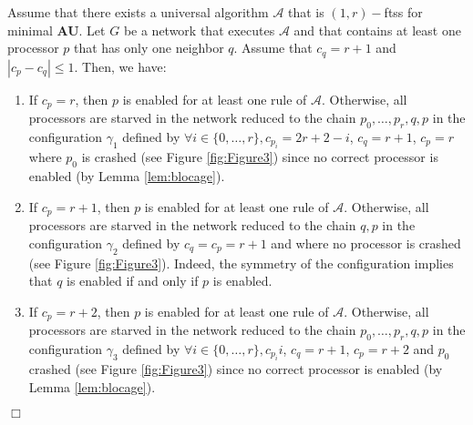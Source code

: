 \documentclass[11pt,english,letterpaper]{article}
\newenvironment{proof}{{\noindent\bf Proof. } }{{\hfill $\Box$}}
\begin{document}
\begin{proof}
Assume that there exists a universal algorithm $\mathcal{A}$ that is $(1,r)-$ftss for minimal \textbf{AU}. Let $G$ be a network that executes $\mathcal{A}$ and that contains at least one processor $p$ that has only one neighbor $q$. Assume that $c_{q}=r+1$ and $|c_{p}-c_{q}|\leq 1$. Then, we have:

\begin{enumerate}
\item If $c_{p}=r$, then $p$ is enabled for at least one rule of $\mathcal{A}$. Otherwise, all processors are starved in the network reduced to the chain $p_{0},\ldots,p_{r},q,p$ in the configuration $\gamma_{1}$ defined by $\forall i\in\{0,\ldots,r\},c_{p_{i}}=2r+2-i$, $c_{q}=r+1$, $c_{p}=r$ where $p_{0}$ is crashed (see Figure \ref{fig:Figure3}) since no correct processor is enabled (by Lemma \ref{lem:blocage}).
\item If $c_{p}=r+1$, then $p$ is enabled for at least one rule of $\mathcal{A}$. Otherwise, all processors are starved in the network reduced to the	chain $q,p$ in the configuration $\gamma_{2}$ defined by $c_{q}=c_{p}=r+1$ and where no processor is crashed (see Figure \ref{fig:Figure3}). Indeed, the symmetry of the configuration implies that $q$ is enabled if and only if $p$ is enabled.
\item If $c_{p}=r+2$, then $p$ is enabled for at least one rule of $\mathcal{A}$. Otherwise, all processors are starved in the network reduced to the	chain $p_{0},\ldots,p_{r},q,p$ in the configuration $\gamma_{3}$ defined by $\forall i\in\{0,\ldots,r\},c_{p_{i}}i$, $c_{q}=r+1$, $c_{p}=r+2$ and $p_{0}$ crashed (see Figure \ref{fig:Figure3}) since no correct processor is enabled (by Lemma \ref{lem:blocage}).
\end{enumerate}


\end{proof}
\end{document}
